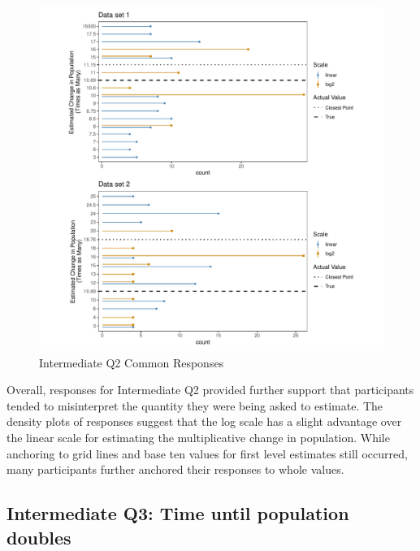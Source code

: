 \documentclass[print]{nuthesis}
\begin{document}
\begin{figure}[tbp]

{\centering \includegraphics[width=1\linewidth,]{thesis_files/figure-latex/qi2-common-responses-1} 

}

\caption{Intermediate Q2 Common Responses}\label{fig:qi2-common-responses}
\end{figure}

Overall, responses for Intermediate Q2 provided further support that participants tended to misinterpret the quantity they were being asked to estimate.
The density plots of responses suggest that the log scale has a slight advantage over the linear scale for estimating the multiplicative change in population.
While anchoring to grid lines and base ten values for first level estimates still occurred, many participants further anchored their responses to whole values.

\hypertarget{intermediate-q3-time-until-population-doubles}{%
\subsection{Intermediate Q3: Time until population doubles}\label{intermediate-q3-time-until-population-doubles}}
\end{document}
